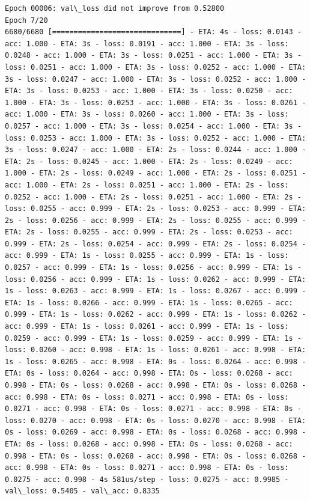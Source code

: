 \documentclass[11pt]{article}
\begin{document}
\begin{Verbatim}[commandchars=\\\{\}]
Epoch 00006: val\_loss did not improve from 0.52800
Epoch 7/20
6680/6680 [==============================] - ETA: 4s - loss: 0.0143 - acc: 1.000 - ETA: 3s - loss: 0.0191 - acc: 1.000 - ETA: 3s - loss: 0.0248 - acc: 1.000 - ETA: 3s - loss: 0.0251 - acc: 1.000 - ETA: 3s - loss: 0.0251 - acc: 1.000 - ETA: 3s - loss: 0.0252 - acc: 1.000 - ETA: 3s - loss: 0.0247 - acc: 1.000 - ETA: 3s - loss: 0.0252 - acc: 1.000 - ETA: 3s - loss: 0.0253 - acc: 1.000 - ETA: 3s - loss: 0.0250 - acc: 1.000 - ETA: 3s - loss: 0.0253 - acc: 1.000 - ETA: 3s - loss: 0.0261 - acc: 1.000 - ETA: 3s - loss: 0.0260 - acc: 1.000 - ETA: 3s - loss: 0.0257 - acc: 1.000 - ETA: 3s - loss: 0.0254 - acc: 1.000 - ETA: 3s - loss: 0.0253 - acc: 1.000 - ETA: 3s - loss: 0.0252 - acc: 1.000 - ETA: 3s - loss: 0.0247 - acc: 1.000 - ETA: 2s - loss: 0.0244 - acc: 1.000 - ETA: 2s - loss: 0.0245 - acc: 1.000 - ETA: 2s - loss: 0.0249 - acc: 1.000 - ETA: 2s - loss: 0.0249 - acc: 1.000 - ETA: 2s - loss: 0.0251 - acc: 1.000 - ETA: 2s - loss: 0.0251 - acc: 1.000 - ETA: 2s - loss: 0.0252 - acc: 1.000 - ETA: 2s - loss: 0.0251 - acc: 1.000 - ETA: 2s - loss: 0.0255 - acc: 0.999 - ETA: 2s - loss: 0.0253 - acc: 0.999 - ETA: 2s - loss: 0.0256 - acc: 0.999 - ETA: 2s - loss: 0.0255 - acc: 0.999 - ETA: 2s - loss: 0.0255 - acc: 0.999 - ETA: 2s - loss: 0.0253 - acc: 0.999 - ETA: 2s - loss: 0.0254 - acc: 0.999 - ETA: 2s - loss: 0.0254 - acc: 0.999 - ETA: 1s - loss: 0.0255 - acc: 0.999 - ETA: 1s - loss: 0.0257 - acc: 0.999 - ETA: 1s - loss: 0.0256 - acc: 0.999 - ETA: 1s - loss: 0.0256 - acc: 0.999 - ETA: 1s - loss: 0.0262 - acc: 0.999 - ETA: 1s - loss: 0.0263 - acc: 0.999 - ETA: 1s - loss: 0.0267 - acc: 0.999 - ETA: 1s - loss: 0.0266 - acc: 0.999 - ETA: 1s - loss: 0.0265 - acc: 0.999 - ETA: 1s - loss: 0.0262 - acc: 0.999 - ETA: 1s - loss: 0.0262 - acc: 0.999 - ETA: 1s - loss: 0.0261 - acc: 0.999 - ETA: 1s - loss: 0.0259 - acc: 0.999 - ETA: 1s - loss: 0.0259 - acc: 0.999 - ETA: 1s - loss: 0.0260 - acc: 0.998 - ETA: 1s - loss: 0.0261 - acc: 0.998 - ETA: 1s - loss: 0.0265 - acc: 0.998 - ETA: 0s - loss: 0.0264 - acc: 0.998 - ETA: 0s - loss: 0.0264 - acc: 0.998 - ETA: 0s - loss: 0.0268 - acc: 0.998 - ETA: 0s - loss: 0.0268 - acc: 0.998 - ETA: 0s - loss: 0.0268 - acc: 0.998 - ETA: 0s - loss: 0.0271 - acc: 0.998 - ETA: 0s - loss: 0.0271 - acc: 0.998 - ETA: 0s - loss: 0.0271 - acc: 0.998 - ETA: 0s - loss: 0.0270 - acc: 0.998 - ETA: 0s - loss: 0.0270 - acc: 0.998 - ETA: 0s - loss: 0.0269 - acc: 0.998 - ETA: 0s - loss: 0.0268 - acc: 0.998 - ETA: 0s - loss: 0.0268 - acc: 0.998 - ETA: 0s - loss: 0.0268 - acc: 0.998 - ETA: 0s - loss: 0.0268 - acc: 0.998 - ETA: 0s - loss: 0.0268 - acc: 0.998 - ETA: 0s - loss: 0.0271 - acc: 0.998 - ETA: 0s - loss: 0.0275 - acc: 0.998 - 4s 581us/step - loss: 0.0275 - acc: 0.9985 - val\_loss: 0.5405 - val\_acc: 0.8335


\end{Verbatim}
\end{document}
